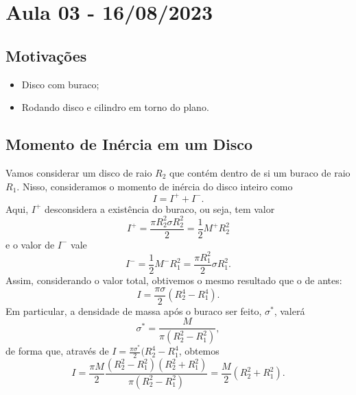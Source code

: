 \documentclass[PhysicsII/physicsII_notes.tex]{subfiles}
\begin{document}
\section{Aula 03 - 16/08/2023}
\subsection{Motivações}
\begin{itemize}
	\item Disco com buraco;
	\item Rodando disco e cilindro em torno do plano.
\end{itemize}
\subsection{Momento de Inércia em um Disco}
Vamos considerar um disco de raio \(R_{2}\) que contém dentro de si um buraco de
raio \(R_{1}\). Nisso, consideramos o momento de inércia do disco inteiro como
\[
	I = I^{+} + I^{-}.
\]
Aqui, \(I^{+}\) desconsidera a existência do buraco, ou seja, tem valor
\[
	I^{+} = \frac{\pi R_{2}^{2}\sigma R_{2}^{2}}{2} = \frac{1}{2}M^{+}R_{2}^{2}
\]
e o valor de \(I^{-}\) vale
\[
	I^{-} = \frac{1}{2}M^{-}R_{1}^{2} = \frac{\pi R_{1}^{2}}{2}\sigma R_{1}^{2}.
\]
Assim, considerando o valor total, obtivemos o mesmo resultado que o de antes:
\[
	I = \frac{\pi \sigma }{2}(R_{2}^{4} - R_{1}^{4}).
\]
Em particular, a densidade de massa após o buraco ser feito, \(\sigma^{*} \), valerá
\[
	\sigma ^{*} = \frac{M}{\pi(R_{2}^{2} - R_{1}^{2})},
\]
de forma que, através de \(I = \frac{\pi \sigma^{*}}{2}(R_{2}^{4} - R_{1}^{4}\), obtemos
\[
	I = \frac{\pi M}{2} \frac{(R_{2}^{2}-R_{1}^{2})(R_{2}^{2}+R_{1}^{2})}{\pi (R_{2}^{2}-R_{1}^{2})} = \frac{M}{2}(R_{2}^{2}+R_{1}^{2}).
\]
\end{document}
